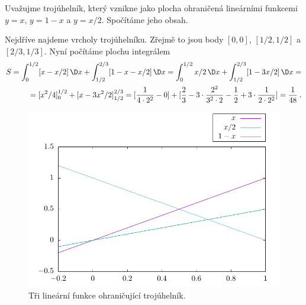 \begin{example}
    Uvažujme trojúhelník, který vznikne jako plocha ohraničená lineárními funkcemi $y=x$, $y=1-x$ a $y=x/2$. Spočítáme jeho obsah.

    Nejdříve najdeme vrcholy trojúhelníku. Zřejmě to jsou body $[0,0]$, $[1/2,1/2]$ a $[2/3,1/3]$.
    Nyní počítáme plochu integrálem \begin{align}
        S = \int_0^{1/2} [x-x/2] \, \D x + \int_{1/2}^{2/3} [1-x - x/2] \, \D x 
        =
        \int_0^{1/2} x/2 \, \D x + \int_{1/2}^{2/3} [1 - 3x/2] \, \D x 
        = \\ =
        [x^2/4]_0^{1/2} + [x-3x^2/2]_{1/2}^{2/3} 
        =
        [\frac{1}{4 \cdot 2^2} - 0 ] + [\frac{2}{3} - 3 \cdot \frac{2^2}{3^2 \cdot 2} - \frac{1}{2} + 3 \cdot \frac{1}{2 \cdot 2^2}] = \frac{1}{48} \:.
    \end{align}

    \begin{figure}[H]
        \centering
        \includegraphics[scale = 0.8]{Gnuplot/Figures/priklad-trojuhelnik-obr.pdf}
        \caption{Tři lineární funkce ohraničující trojúhelník.}
    \end{figure}

\end{example}


